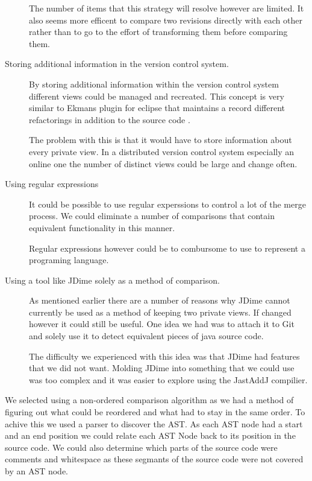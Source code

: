\begin{description}
    The number of items that this strategy will resolve however are limited. It also seems more efficent to compare two revisions directly with each other rather than to go to the effort of transforming them before comparing them. 
  \item [Storing additional information in the version control system.]
    By storing additional information within the version control system different views could be managed and recreated.
    This concept is very similar to Ekmans plugin for eclipse that maintains a record different refactorings in addition to the source code \cite{Ekman2004}.

    The problem with this is that it would have to store information about every private view.  In a distributed version control system especially an online one the number of distinct views could be large and change often.   
  \item [Using regular expressions]
   It could be possible to use regular experssions to control a lot of the merge process.  We could eliminate a number of comparisons that contain equivalent functionality in this manner.

   Regular expressions however could be to combursome to use to represent a programing language.

    
  \item [Using a tool like JDime solely as a method of comparison.]
    As mentioned earlier there are a number of reasons why JDime cannot currently be used as a method of keeping two private views. If changed however it could still be useful.  One idea we had was to attach it to Git and solely use it to detect equivalent pieces of java source code.

    The difficulty we experienced with this idea was that JDime had features that we did not want.  Molding JDime into something that we could use was too complex and it was easier to explore using the JastAddJ compilier. 
\end{description}

We selected using a non-ordered comparison algorithm as we had a method of figuring out what could be reordered and what had to stay in the same order.  To achive this we used a parser to discover the AST.  As each AST node had a start and an end position we could relate each AST Node back to its position in the source code.  We could also determine which parts of the source code were comments and whitespace as these segmants of the source code were not covered by an AST node.

